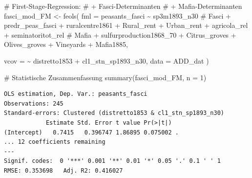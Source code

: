 \documentclass[
  a4paper,
  DIV=11,
  oneside]{scrreprt}
\newenvironment{Shaded}{\begin{snugshade}}{\end{snugshade}}
\newcommand{\AttributeTok}[1]{\textcolor[rgb]{0.40,0.45,0.13}{#1}}
\newcommand{\CommentTok}[1]{\textcolor[rgb]{0.37,0.37,0.37}{#1}}
\newcommand{\DecValTok}[1]{\textcolor[rgb]{0.68,0.00,0.00}{#1}}
\newcommand{\FunctionTok}[1]{\textcolor[rgb]{0.28,0.35,0.67}{#1}}
\newcommand{\NormalTok}[1]{\textcolor[rgb]{0.00,0.23,0.31}{#1}}
\newcommand{\OtherTok}[1]{\textcolor[rgb]{0.00,0.23,0.31}{#1}}
\newcommand{\SpecialCharTok}[1]{\textcolor[rgb]{0.37,0.37,0.37}{#1}}
\begin{document}
\begin{Shaded}
\begin{Highlighting}[]
\CommentTok{\# First{-}Stage{-}Regression:}
\CommentTok{\# + Fasci{-}Determinanten}
\CommentTok{\# + Mafia{-}Determinanten}
\NormalTok{fasci\_mod\_FM }\OtherTok{\textless{}{-}} \FunctionTok{feols}\NormalTok{(}
  \AttributeTok{fml =}\NormalTok{ peasants\_fasci }\SpecialCharTok{\textasciitilde{}} 
\NormalTok{    sp3m1893\_n30}
    \CommentTok{\# Fasci}
  \SpecialCharTok{+}\NormalTok{ predr\_peas\_fasci}
  \SpecialCharTok{+}\NormalTok{ ruralcentre1861}
  \SpecialCharTok{+}\NormalTok{ Rural\_rent}
  \SpecialCharTok{+}\NormalTok{ Urban\_rent}
  \SpecialCharTok{+}\NormalTok{ agricola\_rel}
  \SpecialCharTok{+}\NormalTok{ seminatoritot\_rel}
    \CommentTok{\# Mafia}
  \SpecialCharTok{+}\NormalTok{ sulfurproduction1868\_70}
  \SpecialCharTok{+}\NormalTok{ Citrus\_groves}
  \SpecialCharTok{+}\NormalTok{ Olives\_groves}
  \SpecialCharTok{+}\NormalTok{ Vineyards}
  \SpecialCharTok{+}\NormalTok{ Mafia1885,}
  
  \AttributeTok{vcov =} \SpecialCharTok{\textasciitilde{}}\NormalTok{ distretto1853 }\SpecialCharTok{+}\NormalTok{ cl1\_stn\_sp1893\_n30,}
  \AttributeTok{data =}\NormalTok{ ADD\_dat }
\NormalTok{) }

\CommentTok{\# Statistische Zusammenfassung}
\FunctionTok{summary}\NormalTok{(fasci\_mod\_FM, }\AttributeTok{n =} \DecValTok{1}\NormalTok{)}
\end{Highlighting}
\end{Shaded}

\begin{verbatim}
OLS estimation, Dep. Var.: peasants_fasci
Observations: 245
Standard-errors: Clustered (distretto1853 & cl1_stn_sp1893_n30) 
            Estimate Std. Error t value Pr(>|t|)    
(Intercept)   0.7415   0.396747 1.86895 0.075002 .  
... 12 coefficients remaining
---
Signif. codes:  0 '***' 0.001 '**' 0.01 '*' 0.05 '.' 0.1 ' ' 1
RMSE: 0.353698   Adj. R2: 0.416027
\end{verbatim}
\end{document}
